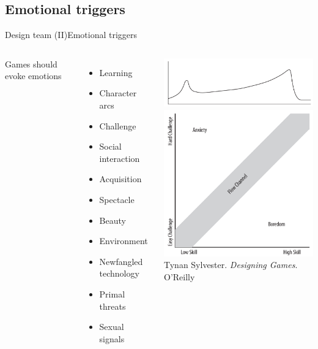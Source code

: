 \documentclass[10pt,compress]{beamer} %
\begin{document}
\subsection{Emotional triggers}
\begin{frame}{Design team (II)}{Emotional triggers}
    \begin{columns}
	Games should evoke emotions
	\begin{itemize}
		\item Learning
        \item Character arcs
        \item Challenge
        \item Social interaction
        \item Acquisition
        \item Spectacle
        \item Beauty
        \item Environment
        \item Newfangled technology
        \item Primal threats
        \item Sexual signals
	\end{itemize}
		\includegraphics[width=\linewidth]{figs/emotionvariation}\\
		\includegraphics[width=\linewidth]{figs/flow}\\
        \tiny{Tynan Sylvester. \textit{Designing Games}. O'Reilly}
    \end{columns}
\end{frame}
\end{document}
